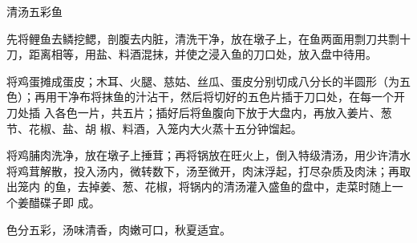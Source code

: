 %
%
%
%
%
%
%
\begin{recipe}[麒麟鱼]{清汤五彩鱼}

\ingredients


\preparation

\step 先将鲤鱼去鳞挖鳃，剖腹去内脏，清洗干净，放在墩子上，在鱼两面用剽刀共剽十
刀，距离相等，用盐、料酒混抹，并使之浸入鱼的刀口处，放入盘中待用。

\step 将鸡蛋摊成蛋皮；木耳、火腿、慈姑、丝瓜、蛋皮分别切成八分长的半圆形（为五
色）；再用干净布将抹鱼的汁沾干，然后将切好的五色片插于刀口处，在每一个开刀处插
入各色一片，共五片；插好后将鱼腹向下放于大盘内，再放入姜片、葱节、花椒、盐、胡
椒、料酒，入笼内大火蒸十五分钟馏起。

\step 将鸡脯肉洗净，放在墩子上捶茸；再将锅放在旺火上，倒入特级清汤，用少许清水
将鸡茸解散，投入汤内，微转数下，汤至微开，肉沫浮起，打尽杂质及肉沬；再取出笼内
的鱼，去掉姜、葱、花椒，将锅内的清汤灌入盛鱼的盘中，走菜时随上一个姜醋碟子即
成。

\features

色分五彩，汤味清香，肉嫩可口，秋夏适宜。

\end{recipe}

